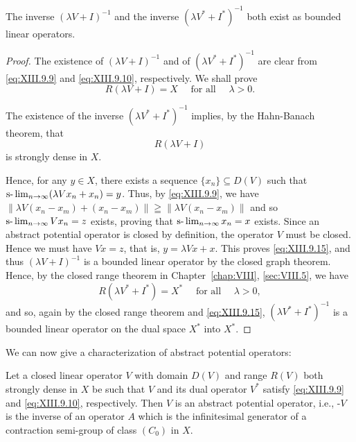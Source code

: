 \begin{corollaryu} The inverse $(\lambda V + I)^{-1}$ and the inverse $(\lambda V^{*} + I^{*})^{-1}$ both exist as bounded linear operators. 
\end{corollaryu}

\begin{proof}
 The existence of $(\lambda V + I)^{-1}$ and of $(\lambda V^{*} + I^{*})^{-1}$ are clear from \eqref{eq:XIII.9.9} and \eqref{eq:XIII.9.10}, respectively. We shall prove 
\begin{equation}\label{eq:XIII.9.15}
R (\lambda V + I) = X \quad \text{ for all } \quad \lambda > 0. \end{equation}

The existence of the inverse $(\lambda V^{*} + I^{*})^{-1}$ implies, by the Hahn-Banach theorem, that 
\[
R (\lambda V + I)
\]
is strongly dense in $X$.\label{eq:XIII.9.15'}

Hence, for any $y \in X$, there exists a sequence $\{x_n\} \subseteq D(V)$ such that $\text{s-}\lim\nolimits_{n \to \infty} (\lambda V x_n + x_n) = y$. Thus, by \eqref{eq:XIII.9.9}, we have $\| \lambda V(x_n - x_m) + (x_n - x_m) \| \geqq \| \lambda V(x_n - x_m) \|$ and so $\text{s-}\lim\nolimits_{n \to \infty} V x_n = z$ exists, proving that $\text{s-}\lim\nolimits_{n \to \infty} x_n = x$ exists. Since an abstract potential operator is closed by definition, the operator $V$ must be closed. Hence we must have $Vx = z$, that is, $y = \lambda Vx + x$. This proves \eqref{eq:XIII.9.15}, and thus $(\lambda V + I)^{-1}$ is a bounded linear operator by the closed graph theorem. Hence, by the closed range theorem in Chapter~\ref{chap:VIII}, \ref{sec:VIII.5}, we have 
\begin{equation}\label{eq:XIII.9.16}
R (\lambda V ^{*} + I ^{*}) = X ^{*} \quad \text{ for all } \quad \lambda > 0,
\end{equation}
and so, again by the closed range theorem and \eqref{eq:XIII.9.15}, $(\lambda V^{*} + I^{*})^{-1}$ is a bounded linear operator on the dual space $X^{*}$ into $X^{*}$.
\end{proof}

We can now give a characterization of abstract potential operators: 

\begin{theorem}\label{thm:XIII.9.Theorem.2} Let a closed linear operator $V$ with domain $D(V)$ and range $R(V)$ both strongly dense in $X$ be such that $V$ and its dual operator $V^{*}$ satisfy \eqref{eq:XIII.9.9} and \eqref{eq:XIII.9.10}, respectively. Then $V$ is an abstract potential operator, i.e., -$V$ is the inverse of an operator $A$ which is the infinitesimal generator of a contraction semi-group of class $(C_{0})$ in $X$. 
\end{theorem}

